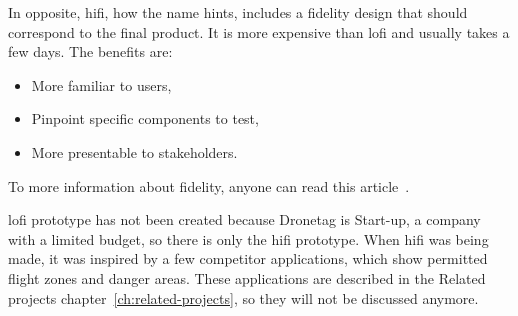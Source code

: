 In opposite, \acrshort{hifi}, how the name hints, includes a fidelity design that should correspond to the final product.
It is more expensive than \acrshort{lofi} and usually takes a few days.
The benefits are:
\begin{itemize}
    \item More familiar to users,
    \item Pinpoint specific components to test,
    \item More presentable to stakeholders.~\cite{hiFiLoFiPrototypeArticle}
\end{itemize}
To more information about fidelity, anyone can read this article~\cite{hiFiLoFiPrototypeArticle}.

\acrshort{lofi} prototype has not been created because Dronetag is Start-up, a company with a limited budget, so there is only the \acrshort{hifi} prototype.
When \acrshort{hifi} was being made, it was inspired by a few competitor applications, which show permitted flight zones and danger areas.
These applications are described in the Related projects chapter~\ref{ch:related-projects}, so they will not be discussed anymore.





